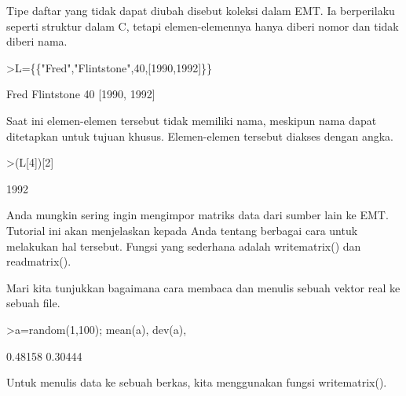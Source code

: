 \documentclass[a4paper,10pt]{article}
\begin{document}
\begin{eulernotebook}
\begin{eulercomment}
\begin{eulercomment}
\begin{eulercomment}
\begin{eulercomment}
\begin{eulercomment}
\begin{eulercomment}
\begin{eulercomment}
\begin{eulercomment}
\begin{eulercomment}
\begin{eulercomment}
\begin{eulercomment}
\begin{eulercomment}
\begin{eulercomment}
\begin{eulercomment}
\begin{eulercomment}
\begin{eulercomment}
\begin{eulercomment}
\begin{eulercomment}
\begin{eulercomment}
\begin{eulercomment}
\begin{eulercomment}
\begin{eulercomment}
\begin{eulercomment}
Tipe daftar yang tidak dapat diubah disebut koleksi dalam EMT. Ia
berperilaku seperti struktur dalam C, tetapi elemen-elemennya hanya
diberi nomor dan tidak diberi nama.
\end{eulercomment}
\begin{eulerprompt}
>L=\{\{"Fred","Flintstone",40,[1990,1992]\}\}
\end{eulerprompt}
\begin{euleroutput}
  Fred
  Flintstone
  40
  [1990,  1992]
\end{euleroutput}
\begin{eulercomment}
Saat ini elemen-elemen tersebut tidak memiliki nama, meskipun nama
dapat ditetapkan untuk tujuan khusus. Elemen-elemen tersebut diakses
dengan angka.
\end{eulercomment}
\begin{eulerprompt}
>(L[4])[2]
\end{eulerprompt}
\begin{euleroutput}
  1992
\end{euleroutput}
\begin{eulercomment}
\begin{eulercomment}
\begin{eulercomment}
Anda mungkin sering ingin mengimpor matriks data dari sumber lain ke
EMT. Tutorial ini akan menjelaskan kepada Anda tentang berbagai cara
untuk melakukan hal tersebut. Fungsi yang sederhana adalah
writematrix() dan readmatrix().

Mari kita tunjukkan bagaimana cara membaca dan menulis sebuah vektor
real ke sebuah file.
\end{eulercomment}
\begin{eulerprompt}
>a=random(1,100); mean(a), dev(a),
\end{eulerprompt}
\begin{euleroutput}
  0.48158
  0.30444
\end{euleroutput}
\begin{eulercomment}
Untuk menulis data ke sebuah berkas, kita menggunakan fungsi
writematrix().


\end{eulercomment}
\end{eulercomment}
\end{eulercomment}
\end{eulercomment}
\end{eulercomment}
\end{eulercomment}
\end{eulercomment}
\end{eulercomment}
\end{eulercomment}
\end{eulercomment}
\end{eulercomment}
\end{eulercomment}
\end{eulercomment}
\end{eulercomment}
\end{eulercomment}
\end{eulercomment}
\end{eulercomment}
\end{eulercomment}
\end{eulercomment}
\end{eulercomment}
\end{eulercomment}
\end{eulercomment}
\end{eulercomment}
\end{eulercomment}
\end{eulercomment}
\end{eulernotebook}
\end{document}
